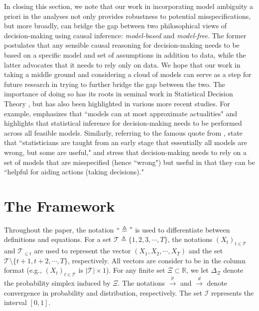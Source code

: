 \documentclass[opre,nonblindrev]{informs2}%
\newcommand{\teq}{\triangleq}
\newcommand{\1}{\hbox{\rm 1\kern-.35em 1}}
\newcommand{\MT}{\mathscr T}
\newcommand{\MI}{\mathscr I}
\begin{document}
In closing this section, we note that our work in incorporating model ambiguity a priori in the analyses not only provides robustness to potential misspecifications, but more broadly, can bridge the gap between two philosophical views of decision-making using causal inference: {\em model-based} and {\em model-free}. The former postulates that any sensible causal reasoning for decision-making  needs to be based on a specific model and set of assumptions in addition to data, while the latter advocates that it needs to rely only on  data. We hope that our work in taking a middle ground and considering a  cloud of models can serve as a step for future research in trying to further bridge the gap between the two. The importance of doing so has its roots in seminal work in Statistical Decision Theory \citep[see, e.g.,][]{Wald1939, Wald1945, Wald1950}, but has also been highlighted in various more recent studies. For example, \cite{Manski2021} emphasizes that ``models can at most approximate actualities"   and highlights that statistical inference for decision-making needs to be performed across all feasible models. Similarly, referring to the famous quote from \cite{Box1979}, \cite{Watson2016}  state that ``statisticians are taught from an early stage that essentially all models are wrong, but some are useful," and stress
that decision-making needs to rely on a set of models that are misspecified (hence ``wrong") but useful in that they can be ``helpful for aiding
actions (taking decisions)."


\section{The Framework} \label{s-framework}

 Throughout the paper, the notation $``\teq"$ is used to differentiate between definitions and equations. For a set $\MT\teq\{1, 2, 3,\cdots, T\}$, the notations $(X_t)_{t\in\MT}$  and $\MT_{\leq t}$ are used to represent the vector $(X_1, X_2,\cdots,X_T)$ and the set $\MT\setminus \{t+1,t+2,\cdots, T\}$, respectively.   All vectors are consider to be in the column format (e.g.,  $(X_t)_{t\in\MT}$ is $|\MT| \times 1$). For any finite set $\Xi\subset \mathbb R$, we let $\Delta_\Xi$  denote the probability simplex induced by $\Xi$.  The notations $\overset{p}{\to}$ and $\overset{d}{\to}$ denote convergence in probability and distribution, respectively. The set $\MI$ represents the interval $[0,1]$.
\end{document}
